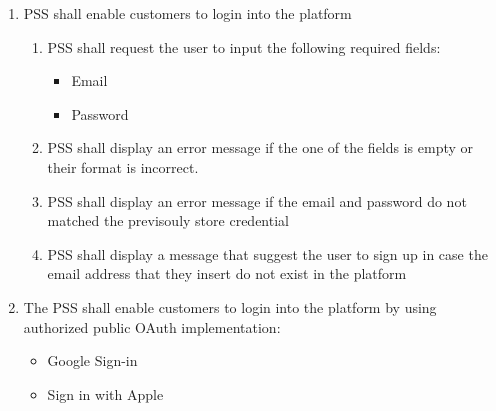 \begin{enumerate}[label=SY-\arabic*]
    \item PSS shall enable customers to login into the platform 
    \begin{enumerate}[label=SY3-\arabic*]
        \item PSS shall request the user to input the following required 
        fields:
        \begin{itemize}
            \item Email
            \item Password
        \end{itemize}
        \item PSS shall display an error message if the one of the fields is 
        empty or their format is incorrect.
        \item PSS shall display an error message if the email and password 
        do not matched the previsouly store credential
        \item PSS shall display a message that suggest the user to sign up
        in case the email address that they insert do not exist in the platform
    \end{enumerate}
    \item The PSS shall enable customers to login into the platform by using 
    authorized public OAuth implementation:
    \begin{itemize}
        \item Google Sign-in \cite{google-sign-in}
        \item Sign in with Apple \cite{sign-in-with-apple}
    \end{itemize}


\end{enumerate}

